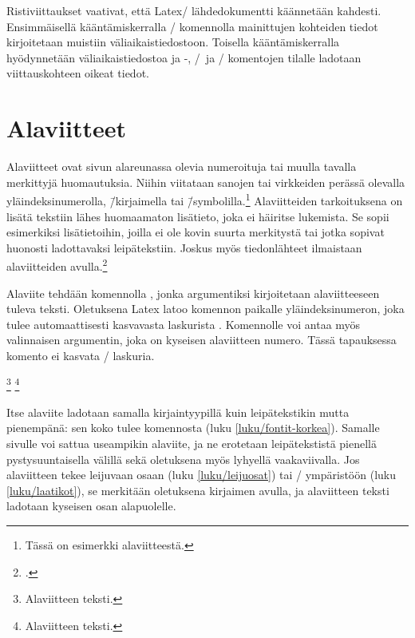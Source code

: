 Ristiviittaukset vaativat, että Latex\-/ lähdedokumentti käännetään
kahdesti. Ensimmäisellä kääntämiskerralla \-/ komennolla
mainittujen kohteiden tiedot kirjoitetaan muistiin väliaikaistiedostoon.
Toisella kääntämiskerralla hyödynnetään väliaikaistiedostoa ja
-, \-/\ ja \-/ komentojen
tilalle ladotaan viittauskohteen oikeat tiedot.

\section{Alaviitteet}
\label{luku/alaviitteet}

Alaviitteet ovat sivun alareunassa olevia numeroituja tai muulla tavalla
merkittyjä huomautuksia. Niihin viitataan sanojen tai virkkeiden perässä
olevalla yläindeksinumerolla, \=/kirjaimella tai
\=/symbolilla.\footnote{Tässä on esimerkki alaviitteestä.} Alaviitteiden
tarkoituksena on lisätä tekstiin lähes huomaamaton lisätieto, joka ei
häiritse lukemista. Se sopii esimerkiksi lisätietoihin, joilla ei ole
kovin suurta merkitystä tai jotka sopivat huonosti ladottavaksi
leipätekstiin. Joskus myös tiedonlähteet ilmaistaan alaviitteiden
avulla.\footcites[162]{kt_oik}[127--128]{typokk}

Alaviite tehdään komennolla , jonka argumentiksi
kirjoitetaan alaviitteeseen tuleva teksti. Oletuksena Latex latoo
komennon paikalle yläindeksinumeron, joka tulee automaattisesti
kasvavasta laskurista . Komennolle voi antaa myös
valinnaisen argumentin, joka on kyseisen alaviitteen numero. Tässä
tapauksessa komento ei kasvata \-/ laskuria.

\begin{koodilohkosis}
\footnote{Alaviitteen teksti.}
\footnote[numero]{Alaviitteen teksti.}
\end{koodilohkosis}

Itse alaviite ladotaan samalla kirjaintyypillä kuin leipätekstikin mutta
pienempänä: sen koko tulee komennosta  (luku
\ref{luku/fontit-korkea}). Samalle sivulle voi sattua useampikin
alaviite, ja ne erotetaan leipätekstistä pienellä pystysuuntaisella
välillä sekä oletuksena myös lyhyellä vaakaviivalla. Jos alaviitteen
tekee leijuvaan osaan (luku \ref{luku/leijuosat}) tai
\-/ ympäristöön (luku \ref{luku/laatikot}), se
merkitään oletuksena kirjaimen avulla, ja alaviitteen teksti ladotaan
kyseisen osan alapuolelle.

